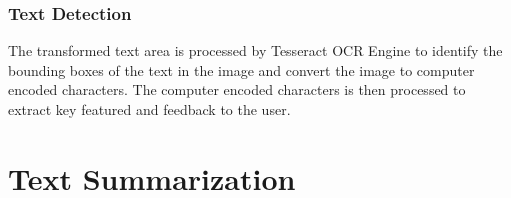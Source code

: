 \subsubsection{Text Detection}
The transformed text area is processed by Tesseract OCR Engine to identify the bounding boxes of the text in the image and convert the image to computer encoded characters. The computer encoded characters is then processed to extract key featured and feedback to the user.

\section{Text Summarization}